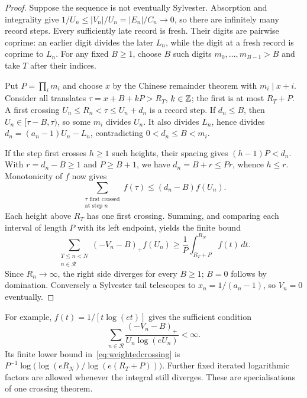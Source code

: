 \documentclass[11pt]{article}
\begin{document}
\begin{proof}
Suppose the sequence is not eventually Sylvester. Absorption and
integrality give $1/U_n\le |V_n|/U_n=|E_n|/C_n\to0$, so there are
infinitely many record steps. Every sufficiently late record is fresh.
Their digits are pairwise coprime: an earlier digit divides the later
$L_n$, while the digit at a fresh record is coprime to $L_n$.
For any fixed $B\ge1$, choose $B$ such digits
$m_0,\ldots,m_{B-1}>B$ and take $T$ after their indices.

Put $P=\prod_i m_i$ and choose $x$ by the Chinese remainder theorem with
$m_i\mid x+i$. Consider all translates $\tau=x+B+kP>R_T$, $k\in\mathbb{Z}$;
the first is at most $R_T+P$. A first crossing
$U_n\le R_n<\tau\le U_n+d_n$ is a record step. If $d_n\le B$, then
$U_n\in[\tau-B,\tau)$, so some $m_i$ divides $U_n$. It also divides
$L_n$, hence divides $d_n=(a_n-1)U_n-L_n$, contradicting
$0<d_n\le B<m_i$.

If the step first crosses $h\ge1$ such heights, their spacing gives
$(h-1)P<d_n$. With $r=d_n-B\ge1$ and $P\ge B+1$, we have
$d_n=B+r\le Pr$, whence $h\le r$. Monotonicity of $f$ now gives
\[
 \sum_{\substack{\tau\text{ first crossed}\\\text{at step }n}}f(\tau)
 \le(d_n-B)f(U_n).
\]
Each height above $R_T$ has one first crossing. Summing, and comparing each
interval of length $P$ with its left endpoint, yields the finite bound
\begin{equation}\label{eq:weightedcrossing}
 \sum_{\substack{T\le n<N\\n\in\mathcal R}}(-V_n-B)_+f(U_n)
 \ge\frac1P\int_{R_T+P}^{R_N} f(t)\,dt.
\end{equation}
Since $R_n\to\infty$, the right side diverges for every $B\ge1$;
$B=0$ follows by domination. Conversely a Sylvester tail telescopes to
$x_n=1/(a_n-1)$, so $V_n=0$ eventually.
\end{proof}

For example, $f(t)=1/[t\log(et)]$ gives the sufficient condition
\[
 \sum_{n\in\mathcal R}\frac{(-V_n-B)_+}{U_n\log(eU_n)}<\infty.
\]
Its finite lower bound in~\eqref{eq:weightedcrossing} is
$P^{-1}\log\bigl(\log(eR_N)/\log(e(R_T+P))\bigr)$.
Further fixed iterated logarithmic factors are allowed whenever the integral
still diverges. These are specialisations of one crossing theorem.
\end{document}
